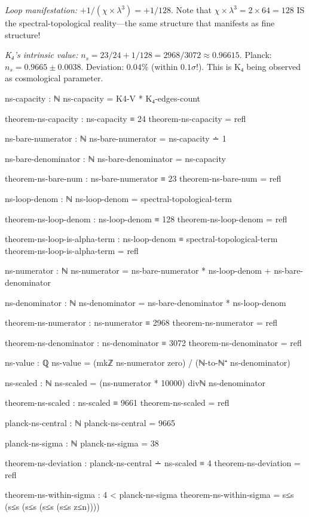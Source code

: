 \documentclass[11pt,a4paper]{book}
\begin{document}
\emph{Loop manifestation:} $+1/(\chi \times \lambda^3) = +1/128$.
Note that $\chi \times \lambda^3 = 2 \times 64 = 128$ IS the spectral-topological 
reality—the same structure that manifests as fine structure!

\emph{K₄'s intrinsic value:} $n_s = 23/24 + 1/128 = 2968/3072 \approx 0.96615$.
Planck: $n_s = 0.9665 \pm 0.0038$. Deviation: $0.04\%$ (within $0.1\sigma$!).
This is K₄ being observed as cosmological parameter.

\begin{code}
ns-capacity : ℕ
ns-capacity = K4-V * K₄-edges-count

theorem-ns-capacity : ns-capacity ≡ 24
theorem-ns-capacity = refl

ns-bare-numerator : ℕ
ns-bare-numerator = ns-capacity ∸ 1

ns-bare-denominator : ℕ
ns-bare-denominator = ns-capacity

theorem-ns-bare-num : ns-bare-numerator ≡ 23
theorem-ns-bare-num = refl

ns-loop-denom : ℕ
ns-loop-denom = spectral-topological-term

theorem-ns-loop-denom : ns-loop-denom ≡ 128
theorem-ns-loop-denom = refl

theorem-ns-loop-is-alpha-term : ns-loop-denom ≡ spectral-topological-term
theorem-ns-loop-is-alpha-term = refl

ns-numerator : ℕ
ns-numerator = ns-bare-numerator * ns-loop-denom + ns-bare-denominator

ns-denominator : ℕ
ns-denominator = ns-bare-denominator * ns-loop-denom

theorem-ns-numerator : ns-numerator ≡ 2968
theorem-ns-numerator = refl

theorem-ns-denominator : ns-denominator ≡ 3072
theorem-ns-denominator = refl

ns-value : ℚ
ns-value = (mkℤ ns-numerator zero) / (ℕ-to-ℕ⁺ ns-denominator)

ns-scaled : ℕ
ns-scaled = (ns-numerator * 10000) divℕ ns-denominator

theorem-ns-scaled : ns-scaled ≡ 9661
theorem-ns-scaled = refl

planck-ns-central : ℕ
planck-ns-central = 9665

planck-ns-sigma : ℕ
planck-ns-sigma = 38

theorem-ns-deviation : planck-ns-central ∸ ns-scaled ≡ 4
theorem-ns-deviation = refl

theorem-ns-within-sigma : 4 < planck-ns-sigma
theorem-ns-within-sigma = s≤s (s≤s (s≤s (s≤s (s≤s z≤n))))

\end{code}
\end{document}
